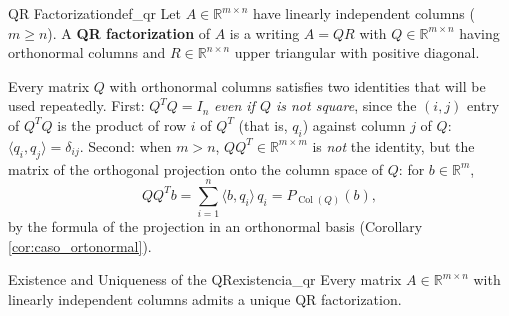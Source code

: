 \documentclass[11pt, a4paper]{article}
\begin{document}
\begin{definicion}{QR Factorization}{def_qr}
Let $A \in \mathbb{R}^{m \times n}$ have linearly independent columns ($m \ge n$). A \textbf{QR factorization} of $A$ is a writing $A = QR$ with $Q \in \mathbb{R}^{m \times n}$ having orthonormal columns and $R \in \mathbb{R}^{n \times n}$ upper triangular with positive diagonal.
\end{definicion}

\obs Every matrix $Q$ with orthonormal columns satisfies two identities that will be used repeatedly. First: $Q^T Q = I_n$ \emph{even if $Q$ is not square}, since the $(i, j)$ entry of $Q^T Q$ is the product of row $i$ of $Q^T$ (that is, $q_i$) against column $j$ of $Q$: $\langle q_i, q_j \rangle = \delta_{ij}$. Second: when $m > n$, $Q Q^T \in \mathbb{R}^{m \times m}$ is \emph{not} the identity, but the matrix of the orthogonal projection onto the column space of $Q$: for $b \in \mathbb{R}^m$,
\[
Q Q^T b = \sum_{i=1}^{n} \langle b, q_i \rangle \, q_i = P_{\operatorname{Col}(Q)}(b),
\]
by the formula of the projection in an orthonormal basis (Corollary \ref{cor:caso_ortonormal}).

\begin{teorema}{Existence and Uniqueness of the QR}{existencia_qr}
Every matrix $A \in \mathbb{R}^{m \times n}$ with linearly independent columns admits a unique QR factorization.
\end{teorema}
\end{document}
